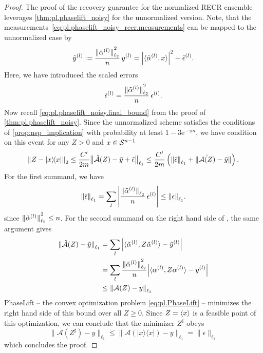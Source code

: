 \begin{proof}
  The proof of the recovery guarantee for the normalized RECR ensemble leverages \cref{thm:pl.phaselift_noisy} for the unnormalized version.
  Note, that the measurements~\eqref{eq:pl.phaselift_noisy_recr.measurements} can be mapped to the unnormalized case by
  \[
    \label{eq:pl.phaselift_noisy_recr.unnormalized_measurements}
    \tilde y^{(l)}
    := \frac{{\Vert\tilde\alpha^{(l)}\Vert}_{\ell_2}^2}{n} \, y^{(l)}
    = {\left\vert\braket{\tilde\alpha^{(l)}, x}\right\vert}^2 + \tilde \epsilon^{(l)}.
  \]
  Here, we have introduced the scaled errors
  \[
    \tilde \epsilon^{(l)} = \frac{{\Vert\tilde\alpha^{(l)}\Vert}_{\ell_2}^2}{n} \, \epsilon^{(l)}.
  \]
  Now recall \cref{eq:pl.phaselift_noisy.final_bound} from the proof of \cref{thm:pl.phaselift_noisy}.
  Since the unnormalized scheme satisfies the conditions of \cref{prop:nsp_implication} with probability at least $1-3 \mathrm{e}^{-\gamma m}$, we have condition on this event for any $Z > 0$ and $x \in \mathcal{S}^{n-1}$
  \[
    \Fnorm{Z - \ketbra{x}}
    \le \frac{C'}{2m} \Norm{\tilde{\mathcal{A}}(Z) - \tilde y + \tilde \epsilon}_{\ell_1}
    \le \frac{C'}{2m} \left( \norm{\tilde \epsilon}_{\ell_1} + \norm{\tilde{\mathcal{A}(Z)} - \tilde y} \right).
    \label{eq:phaselift_noisy_recr.findal_bound}
  \]
  For the first summand, we have
  \[
    {\Vert\tilde\epsilon\Vert}_{\ell_1}  = \sum_l {\left\vert  \frac{{\Vert\tilde\alpha^{(l)}\Vert}_{\ell_2}}{n} \, \epsilon^{(l)}  \right\vert} \le {\Vert\epsilon\Vert}_{\ell_1}.
  \]
  since ${\Vert\tilde\alpha^{(l)}\Vert}_{\ell_2}^2 \le n$.
  For the second summand on the right hand side of , the same argument gives
  \begin{align}
    {\Vert\tilde{\mathcal{A}}(Z) - \tilde y\Vert}_{\ell_1}
    &= \sum_l {\left\vert  \braket{\tilde\alpha^{(l)}, Z \tilde\alpha^{(l)}} - \tilde y^{(l)}  \right\vert} \\
    &= \sum_l \frac{{\Vert\tilde\alpha^{(l)}\Vert}_{\ell_2}^2}{n}  {\left\vert \braket{\alpha^{(l)}, Z \alpha^{(l)}} - y^{(l)}  \right\vert} \\
    &\le {\Vert\mathcal{A}(Z) - y\Vert}_{\ell_1}
  \end{align}
  PhaseLift -- the convex optimization problem \eqref{eq:pl.PhaseLift} -- minimizes the right hand side of this bound over all $ Z \geq 0$.
  Since $Z = \braket{x}$ is a feasible point of this optimization, we can conclude that the minimizer $Z^\sharp$ obeys
  \[
    \| \mathcal{A}( Z^\sharp) - {y} \|_{\ell_1} \leq \| \mathcal{A}(|{x} \rangle \! \langle {x}|)-{y} \|_{\ell_1} = \| {\epsilon} \|_{\ell_1}
  \]
  which concludes the proof.
\end{proof}


